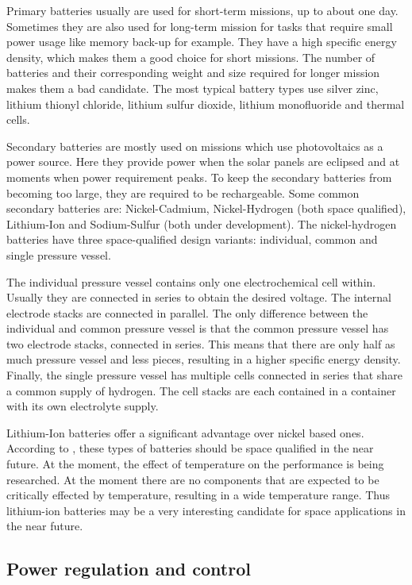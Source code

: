 Primary batteries usually are used for short-term missions, up to about one day. Sometimes they are also used for long-term mission for tasks that require small power usage like memory back-up for example. They have a high specific energy density, which makes them a good choice for short missions. The number of batteries and their corresponding weight and size required for longer mission makes them a bad candidate. The most typical battery types use silver zinc, lithium thionyl chloride, lithium sulfur dioxide, lithium monofluoride and thermal cells.

Secondary batteries are mostly used on missions which use photovoltaics as a power source. Here they provide power when the solar panels are eclipsed and at moments when power requirement peaks. To keep the secondary batteries from becoming too large, they are required to be rechargeable. Some common secondary batteries are: Nickel-Cadmium, Nickel-Hydrogen (both space qualified), Lithium-Ion and Sodium-Sulfur (both under development). The nickel-hydrogen batteries have three space-qualified design variants: individual, common and single pressure vessel.

The individual pressure vessel contains only one electrochemical cell within. Usually they are connected in series to obtain the desired voltage. The internal electrode stacks are connected in parallel. The only difference between the individual and common pressure vessel is that the common pressure vessel has two electrode stacks, connected in series. This means that there are only half as much pressure vessel and less pieces, resulting in a higher specific energy density. Finally, the single pressure vessel has multiple cells connected in series that share a common supply of hydrogen. The cell stacks are each contained in a container with its own electrolyte supply\cite{larson}. 

Lithium-Ion batteries offer a significant advantage over nickel based ones. According to \cite{larson}, these types of batteries should be space qualified in the near future. At the moment, the effect of temperature on the performance is being researched. At the moment there are no components that are expected to be critically effected by temperature, resulting in a wide temperature range. Thus lithium-ion batteries may be a very interesting candidate for space applications in the near future\cite{lithium1}.

\subsection{Power regulation and control}
\label{blDOregulation}

